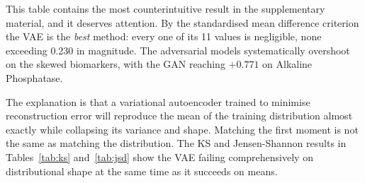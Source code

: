 \documentclass[journal,onecolumn]{IEEEtran}
\begin{document}
\begin{table}[!t]
  \centering
  \caption{Cohen's $d$ Between Synthetic and Real Training Data. Values Near Zero Indicate Well-Matched Means}
  \label{tab:cohens}
\end{table}

This table contains the most counterintuitive result in the supplementary material, and it deserves attention. By the standardised mean difference criterion the VAE is the \emph{best} method: every one of its 11 values is negligible, none exceeding 0.230 in magnitude. The adversarial models systematically overshoot on the skewed biomarkers, with the GAN reaching $+0.771$ on Alkaline Phosphatase.

The explanation is that a variational autoencoder trained to minimise reconstruction error will reproduce the mean of the training distribution almost exactly while collapsing its variance and shape. Matching the first moment is not the same as matching the distribution. The KS and Jensen-Shannon results in Tables~\ref{tab:ks} and~\ref{tab:jsd} show the VAE failing comprehensively on distributional shape at the same time as it succeeds on means.
\end{document}
